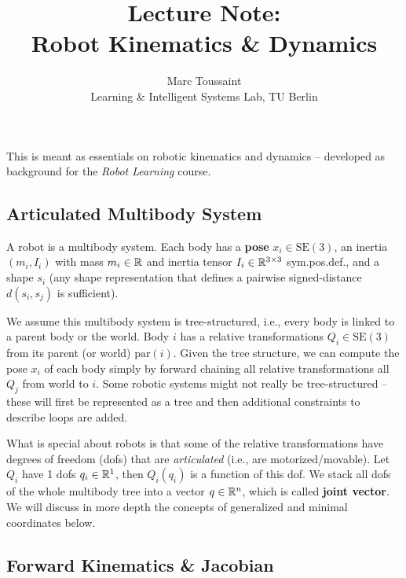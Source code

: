 
\note

\title{Lecture Note:\\ Robot Kinematics \& Dynamics}
\author{Marc Toussaint\\\small Learning \& Intelligent Systems Lab, TU Berlin}

\makeatletter
\renewcommand{\@seccntformat}[1]{}
\makeatother

\newcommand{\pa}{\text{par}}
\newcommand{\SO}{\text{SO}}
\newcommand{\SE}{\text{SE}}
\newcommand{\se}{\text{se}}
\newcommand{\ang}{\text{ang}}

\notetitle


This is meant as essentials on robotic kinematics and
dynamics -- developed as background for the \emph{Robot Learning} course.

\subsection{Articulated Multibody System}

A robot is a multibody
system. Each body has a \textbf{pose} $x_i\in\SE(3)$, an inertia $(m_i, I_i)$
with mass $m_i\in{\mathbb{R}}$ and inertia tensor $I_i \in {\mathbb{R}}^{3\times 3}$
sym.pos.def., and a shape $s_i$ (any shape representation that defines
a pairwise signed-distance $d(s_i, s_j)$ is sufficient).

We assume this multibody system is tree-structured, i.e., every body
is linked to a parent body or the world. Body $i$ has a relative
transformations $Q_i \in \SE(3)$ from its parent (or world)
$\pa(i)$.  Given the tree
structure, we can compute the pose $x_i$ of each body simply by
forward chaining all relative transformations all $Q_j$ from world to
$i$. Some robotic systems might not really be tree-structured --
these will first be represented as a tree
and then additional constraints to describe loops are added.

What is special about robots is that some of the relative
transformations have degrees of freedom (dofs) that are
\emph{articulated} (i.e., are motorized/movable). Let $Q_i$ have 1
dofs $q_i \in {\mathbb{R}}^1$, then $Q_i(q_i)$ is a function of this dof. We
stack all dofs of the whole multibody tree into a vector $q\in{\mathbb{R}}^n$,
which is called \textbf{joint vector}. We will discuss in more depth
the concepts of generalized and minimal coordinates below.


\subsection{Forward Kinematics \& Jacobian}

